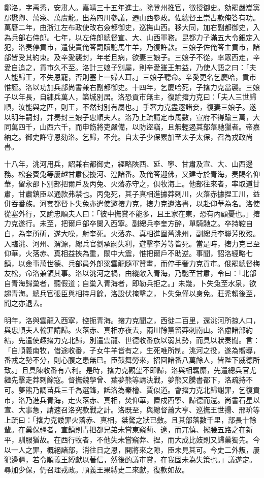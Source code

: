 \begin{pinyinscope}
鄭洛，字禹秀，安肅人。嘉靖三十五年進士。除登州推官，徵授御史。劾罷嚴嵩黨鄢懋卿、萬寀、萬虞龍。出為四川參議，遷山西參政。佐總督王崇古款俺答有功。萬曆二年，由浙江左布政使改右僉都御史，巡撫山西。移大同，加右副都御史，入為兵部右侍郎。七年，以左侍郎總督宣、大、山西軍務。昆都力子滿五大令銀定入犯，洛奏停貢市，遣使責俺答罰贖駝馬牛羊，乃復許款。三娘子佐俺答主貢市，諸部皆受其約束。及辛愛襲封，年老且病，欲妻三娘子。三娘子不從，率眾西走，辛愛自追之，貢市久不至。洛計三娘子別屬，則辛愛雖王無益，乃使人語之曰：「夫人能歸王，不失恩寵，否則塞上一婦人耳。」三娘子聽命。辛愛更名乞慶哈，貢市惟謹。洛以功加兵部尚書兼右副都御史。十四年，乞慶哈死，子撦力克當襲。三娘子以年長，自練兵萬人，築城別居。洛恐貢市無主，復諭撦力克曰：「夫人三世歸順，汝能與之匹，則王，不然封別有屬也。」手奢力克盡逐諸妾，復妻三娘子。遂以明年嗣封，并奏封三娘子忠順夫人。洛乃上疏請定市馬數，宣府不得踰三萬，大同萬四千，山西六千，而申飭將吏嚴備，以防盜竊，且無輕遏其部落馳獵者。帝嘉納之。御史許守恩劾洛。乞歸，不允。自太子少保累加至太子太保，召為戎政尚書。

十八年，洮河用兵，詔兼右都御史，經略陜西、延、寧、甘肅及宣、大、山西邊務。松套賓兔等屢越甘肅侵擾河、湟諸番。及俺答迎佛，又建寺於青海，奏賜名仰華，留永邵卜別部把爾戶及丙兔、火落赤守之，俱牧海上。他部往來者，率取道甘肅，甘肅鎮臣以通款弗禁也。丙兔死，其子真相進據莽剌川，火落赤據捏工川，益併吞番族。河套都督卜失兔亦遣使邀撦力克，撦力克遺洛書，以赴仰華為名。洛使從塞外行，又諭忠順夫人曰：「彼中撫賞不能多，且王家在東，恐有內顧憂也。」撦力克遂行。未至，把爾戶部卒闌入西寧。副總兵李奎方醉，單騎馳之。卒持鞚自白，為奎所斫，遂大噪，射奎死。火落赤、真相進圍舊洮州，副總兵李聯芳敗歿。入臨洮、河州、渭源，總兵官劉承嗣失利，遊擊李芳等皆死。當是時，撦力克已至仰華，火落赤、真相益挾為重，關中大震，惟把爾戶不助逆。事聞，詔洛經略七鎮，以僉事萬世德、兵部員外郎梁雲龍隨軍贊畫，而停手奢力克貢市。俄罷總督梅友松，命洛兼領其事。洛以洮河之禍，由縱敵入青海，乃馳至甘肅，令曰：「北部自青海歸巢者，聽假道；自巢入青海者，即勒兵拒之。」未幾，卜失兔至水泉，欲趨青海。總兵官張臣與相持月餘，洛設伏掩擊之，卜失兔僅以身免。莊禿賴後至，聞之亦退去。

明年，洛與雲龍入西寧，控扼青海。撦力克聞之，西徙二百里，還洮河所掠人口，與忠順夫人輸罪請歸。火落赤、真相亦夜去，兩川餘黨留莽刺南山。洛慮諸部約結，先遣使趣撦力克北歸，別遣雲龍、世德收番族以弱其勢，而具以狀奏聞。言：「自順義南牧，借途收番，子女牛羊皆有之，生死唯所制。洮河之役，遂為嚮導，番戎之勢不分，則心腹之患無已。臣鼓舞勞來，招回諸番八萬餘人，皆陛下威德所致。」且具陳收番有六利。是時，撦力克觀望不即歸，洛與相羈縻，先遣總兵官尤繼先擊走莽剌餘寇。督撫魏學曾、葉夢熊等請決戰，夢熊又騰書都下，洛疏持不可。夢熊乃調苗兵三千為選鋒，詆洛為秦檜、賈似道。會撦力克北歸謝罪，乞復貢市，洛乃進兵青海，走火落赤、真相，焚仰華，置戍西寧、歸德而還。尚書石星以宣、大事急，請速召洛究款戰之計。洛既至，與總督蕭大亨、巡撫王世揚、邢玠等上疏曰：「撦力克諉罪火落赤、真相，桀驁之狀已斂。且其部落數千里，部長十餘輩。在巢保疆者，宣鎮則青把都兄弟未嘗東窺薊、遼，而兀慎、擺腰五路之在新平，馴服猶故。在西行牧者，不他失未嘗窺莽、捏，而大成比妓則又歸巢獨先。今以一人之罪，概絕諸部，消往日之恩，開將來之隙，臣未見其可。今史二外叛，屢犯邊疆，若令順義王縛獻以著信，然後酌議市賞，在我固未為失策也。」議遂定。尋加少保，仍召理戎政。順義王果縛史二來獻，復款如故。


\end{pinyinscope}
